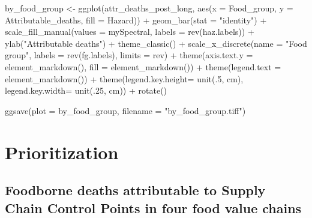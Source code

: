 \documentclass[
  letterpaper,
  DIV=11,
  numbers=noendperiod]{scrartcl}
\newenvironment{Shaded}{\begin{snugshade}}{\end{snugshade}}
\newcommand{\AttributeTok}[1]{\textcolor[rgb]{0.40,0.45,0.13}{#1}}
\newcommand{\DecValTok}[1]{\textcolor[rgb]{0.68,0.00,0.00}{#1}}
\newcommand{\FunctionTok}[1]{\textcolor[rgb]{0.28,0.35,0.67}{#1}}
\newcommand{\NormalTok}[1]{\textcolor[rgb]{0.00,0.23,0.31}{#1}}
\newcommand{\OtherTok}[1]{\textcolor[rgb]{0.00,0.23,0.31}{#1}}
\newcommand{\SpecialCharTok}[1]{\textcolor[rgb]{0.37,0.37,0.37}{#1}}
\newcommand{\StringTok}[1]{\textcolor[rgb]{0.13,0.47,0.30}{#1}}
\begin{document}
\begin{Shaded}
\begin{Highlighting}[]
\NormalTok{by\_food\_group }\OtherTok{\textless{}{-}} 
  \FunctionTok{ggplot}\NormalTok{(attr\_deaths\_post\_long, }\FunctionTok{aes}\NormalTok{(}\AttributeTok{x =}\NormalTok{ Food\_group,}
                                    \AttributeTok{y =}\NormalTok{ Attributable\_deaths, }\AttributeTok{fill =}\NormalTok{ Hazard)) }\SpecialCharTok{+} 
  \FunctionTok{geom\_bar}\NormalTok{(}\AttributeTok{stat =} \StringTok{"identity"}\NormalTok{) }\SpecialCharTok{+}
  \FunctionTok{scale\_fill\_manual}\NormalTok{(}\AttributeTok{values =}\NormalTok{ mySpectral, }\AttributeTok{labels =} \FunctionTok{rev}\NormalTok{(haz.labels)) }\SpecialCharTok{+}
  \FunctionTok{ylab}\NormalTok{(}\StringTok{"Attributable deaths"}\NormalTok{) }\SpecialCharTok{+}
  \FunctionTok{theme\_classic}\NormalTok{() }\SpecialCharTok{+}
  \FunctionTok{scale\_x\_discrete}\NormalTok{(}\AttributeTok{name =} \StringTok{"Food group"}\NormalTok{, }\AttributeTok{labels =} \FunctionTok{rev}\NormalTok{(fg.labels), }\AttributeTok{limits =}\NormalTok{ rev) }\SpecialCharTok{+}
  \FunctionTok{theme}\NormalTok{(}\AttributeTok{axis.text.y =} \FunctionTok{element\_markdown}\NormalTok{(),}
        \AttributeTok{fill =} \FunctionTok{element\_markdown}\NormalTok{()) }\SpecialCharTok{+}
  \FunctionTok{theme}\NormalTok{(}\AttributeTok{legend.text =} \FunctionTok{element\_markdown}\NormalTok{()) }\SpecialCharTok{+}
  \FunctionTok{theme}\NormalTok{(}\AttributeTok{legend.key.height=} \FunctionTok{unit}\NormalTok{(.}\DecValTok{5}\NormalTok{, }\StringTok{\textquotesingle{}cm\textquotesingle{}}\NormalTok{),}
        \AttributeTok{legend.key.width=} \FunctionTok{unit}\NormalTok{(.}\DecValTok{25}\NormalTok{, }\StringTok{\textquotesingle{}cm\textquotesingle{}}\NormalTok{)) }\SpecialCharTok{+}
  \FunctionTok{rotate}\NormalTok{()}

\FunctionTok{ggsave}\NormalTok{(}\AttributeTok{plot =}\NormalTok{ by\_food\_group, }\AttributeTok{filename =} \StringTok{"by\_food\_group.tiff"}\NormalTok{)}
\end{Highlighting}
\end{Shaded}

\section{Prioritization}\label{prioritization}

\subsection{Foodborne deaths attributable to Supply Chain Control Points
in four food value
chains}\label{foodborne-deaths-attributable-to-supply-chain-control-points-in-four-food-value-chains}
\end{document}
